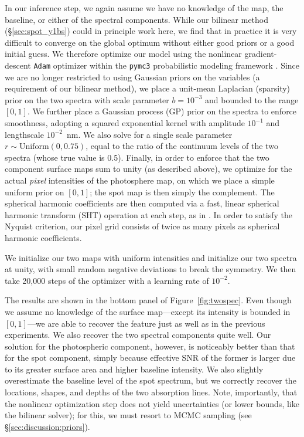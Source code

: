 \documentclass[modern]{aastex631}
\begin{document}
In our inference step, we again assume we have no knowledge of the map, the baseline, or either of the spectral components.
While our bilinear method (\S\ref{sec:spot_y1bs}) could in principle work here, we find that in practice it is very difficult to converge on the global optimum without either good priors or a good initial guess.
We therefore optimize our model using the nonlinear gradient-descent \texttt{Adam} optimizer \citep{Adam} within the \texttt{pymc3} probabilistic modeling framework \citep{Salvatier2016}.
Since we are no longer restricted to using Gaussian priors on the variables (a requirement of our bilinear method), we place a unit-mean Laplacian (sparsity) prior on the two spectra with scale parameter $b = 10^{-3}$ and bounded to the range $[0, 1]$.
%
We further place a Gaussian process (GP) prior on the spectra to enforce smoothness, adopting a squared exponential kernel with amplitude $10^{-1}$ and lengthscale $10^{-2}$~nm.
%
We also solve for a single scale parameter $r \sim \mathrm{Uniform}(0, 0.75)$, equal to the ratio of the continuum levels of the two spectra (whose true value is 0.5).
Finally, in order to enforce that the two component surface maps sum to unity (as described above), we optimize for the actual \emph{pixel} intensities of the photosphere map, on which we place a simple uniform prior on $[0, 1]$; the spot map is then simply the complement.
The spherical harmonic coefficients are then computed via a fast, linear spherical harmonic transform (SHT) operation at each step, as in \citep{Bartolic2021}.
In order to satisfy the Nyquist criterion, our pixel grid consists of twice as many pixels as spherical harmonic coefficients.

We initialize our two maps with uniform intensities and initialize our two spectra at unity, with small random negative deviations to break the symmetry.
We then take 20,000 steps of the optimizer with a learning rate of $10^{-2}$.

The results are shown in the bottom panel of Figure~\ref{fig:twospec}.
Even though we assume no knowledge of the surface map---except its intensity is bounded in $[0, 1]$---we are able to recover the \spot feature just as well as in the previous experiments.
We also recover the two spectral components quite well.
Our solution for the photospheric component, however, is noticeably better than that for the spot component, simply because effective SNR of the former is larger due to its greater surface area and higher baseline intensity.
We also slightly overestimate the baseline level of the spot spectrum, but we correctly recover the locations, shapes, and depths of the two absorption lines.
Note, importantly, that the nonlinear optimization step does not yield uncertainties (or lower bounds, like the bilinear solver); for this, we must resort to MCMC sampling (see \S\ref{sec:discussion:priors}).
\end{document}
